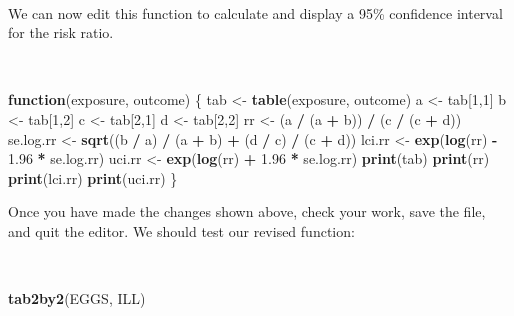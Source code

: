 \documentclass[12pt,a4paper]{book}
\newenvironment{Shaded}{\begin{snugshade}}{\end{snugshade}}
\newcommand{\KeywordTok}[1]{\textcolor[rgb]{0.13,0.29,0.53}{\textbf{#1}}}
\newcommand{\DecValTok}[1]{\textcolor[rgb]{0.00,0.00,0.81}{#1}}
\newcommand{\FloatTok}[1]{\textcolor[rgb]{0.00,0.00,0.81}{#1}}
\newcommand{\StringTok}[1]{\textcolor[rgb]{0.31,0.60,0.02}{#1}}
\newcommand{\ControlFlowTok}[1]{\textcolor[rgb]{0.13,0.29,0.53}{\textbf{#1}}}
\newcommand{\OperatorTok}[1]{\textcolor[rgb]{0.81,0.36,0.00}{\textbf{#1}}}
\newcommand{\NormalTok}[1]{#1}
\theoremstyle{definition}
\theoremstyle{definition}
\theoremstyle{definition}
\theoremstyle{remark}
\begin{document}
~

We can now edit this function to calculate and display a 95\% confidence
interval for the risk ratio.

~

\begin{Shaded}
\begin{Highlighting}[]
\ControlFlowTok{function}\NormalTok{(exposure, outcome) \{}
\NormalTok{  tab <-}\StringTok{ }\KeywordTok{table}\NormalTok{(exposure, outcome)}
\NormalTok{  a <-}\StringTok{ }\NormalTok{tab[}\DecValTok{1}\NormalTok{,}\DecValTok{1}\NormalTok{]}
\NormalTok{  b <-}\StringTok{ }\NormalTok{tab[}\DecValTok{1}\NormalTok{,}\DecValTok{2}\NormalTok{]}
\NormalTok{  c <-}\StringTok{ }\NormalTok{tab[}\DecValTok{2}\NormalTok{,}\DecValTok{1}\NormalTok{]}
\NormalTok{  d <-}\StringTok{ }\NormalTok{tab[}\DecValTok{2}\NormalTok{,}\DecValTok{2}\NormalTok{]}
\NormalTok{  rr <-}\StringTok{ }\NormalTok{(a }\OperatorTok{/}\StringTok{ }\NormalTok{(a }\OperatorTok{+}\StringTok{ }\NormalTok{b)) }\OperatorTok{/}\StringTok{ }\NormalTok{(c }\OperatorTok{/}\StringTok{ }\NormalTok{(c }\OperatorTok{+}\StringTok{ }\NormalTok{d))}
\NormalTok{  se.log.rr <-}\StringTok{ }\KeywordTok{sqrt}\NormalTok{((b }\OperatorTok{/}\StringTok{ }\NormalTok{a) }\OperatorTok{/}\StringTok{ }\NormalTok{(a }\OperatorTok{+}\StringTok{ }\NormalTok{b) }\OperatorTok{+}\StringTok{ }\NormalTok{(d }\OperatorTok{/}\StringTok{ }\NormalTok{c) }\OperatorTok{/}\StringTok{ }\NormalTok{(c }\OperatorTok{+}\StringTok{ }\NormalTok{d)) }
\NormalTok{  lci.rr <-}\StringTok{ }\KeywordTok{exp}\NormalTok{(}\KeywordTok{log}\NormalTok{(rr) }\OperatorTok{-}\StringTok{ }\FloatTok{1.96} \OperatorTok{*}\StringTok{ }\NormalTok{se.log.rr)}
\NormalTok{  uci.rr <-}\StringTok{ }\KeywordTok{exp}\NormalTok{(}\KeywordTok{log}\NormalTok{(rr) }\OperatorTok{+}\StringTok{ }\FloatTok{1.96} \OperatorTok{*}\StringTok{ }\NormalTok{se.log.rr)}
  \KeywordTok{print}\NormalTok{(tab)}
  \KeywordTok{print}\NormalTok{(rr)}
  \KeywordTok{print}\NormalTok{(lci.rr)}
  \KeywordTok{print}\NormalTok{(uci.rr)}
\NormalTok{\}}
\end{Highlighting}
\end{Shaded}

\newpage

Once you have made the changes shown above, check your work, save the
file, and quit the editor. We should test our revised function:

~

\begin{Shaded}
\begin{Highlighting}[]
\KeywordTok{tab2by2}\NormalTok{(EGGS, ILL)}
\end{Highlighting}
\end{Shaded}
\end{document}
